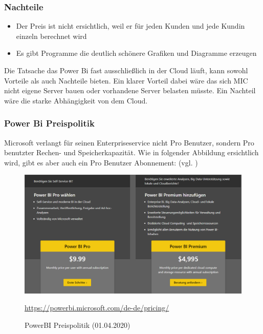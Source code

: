 \subsubsection{Nachteile}
\begin{itemize}
\item Der Preis ist nicht ersichtlich, weil er für jeden Kunden und jede Kundin einzeln berechnet wird
\item Es gibt Programme die deutlich schönere Grafiken und Diagramme erzeugen
\end{itemize}
Die Tatsache das Power Bi fast ausschließlich in der Cloud läuft, kann sowohl Vorteile als auch Nachteile bieten. Ein klarer Vorteil dabei wäre das sich MIC nicht eigene Server bauen oder vorhandene Server belasten müsste. Ein Nachteil wäre die starke Abhängigkeit von dem Cloud.
\subsubsection{Power Bi Preispolitik}
Microsoft verlangt für seinen Enterpriseservice nicht Pro Benutzer, sondern Pro benutzter Rechen- und Speicherkapazität. Wie in folgender Abbildung ersichtlich wird, gibt es aber auch ein Pro Benutzer Abonnement: (vgl. \cite{noauthor_powerbi_2019})
\begin{figure}[H]
    \includegraphics[scale=.60]{images/PowerBi_Preise.png}
    \caption{PowerBI Preispolitik (01.04.2020)}
    \url{https://powerbi.microsoft.com/de-de/pricing/}
    \label{img:powerbi_preise}
\end{figure}

